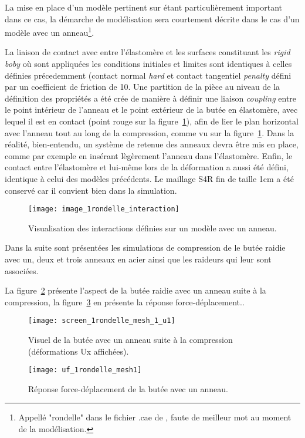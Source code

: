 ﻿\documentclass{article}
\newcommand{\abaqus}{\bsc{Abaqus}\xspace}
\newcommand{\cimg}{0.8}
\begin{document}
La mise en place d'un modèle pertinent sur \abaqus étant particulièrement important dans ce cas, la démarche de modélisation sera courtement décrite dans le cas d'un modèle avec un anneau\footnote{Appellé "rondelle" dans le fichier .cae de \abaqus, faute de meilleur mot au moment de la modélisation.}.

La liaison de contact avec entre l'élastomère et les surfaces constituant les \textit{rigid boby} où sont appliquées les conditions initiales et limites sont identiques à celles définies précedemment (contact normal \textit{hard} et contact tangentiel \textit{penalty} défini par un coefficient de friction de 10. Une partition de la pièce au niveau de la définition des propriétés a été crée de manière à définir une liaison \textit{coupling} entre le point intérieur de l'anneau et le point extérieur de la butée en élastomère, avec lequel il est en contact (point rouge sur la figure~\ref{fig28}), afin de lier le plan horizontal avec l'anneau tout au long de la compression, comme vu sur la figure~\ref{fig28}. Dans la réalité, bien-entendu, un système de retenue des anneaux devra être mis en place, comme par exemple en insérant lègèrement l'anneau dans l'élastomère. Enfin, le contact entre l'élastomère et lui-même lors de la déformation a aussi été défini, identique à celui des modèles précédents. Le maillage S4R fin de taille 1cm a été conservé car il convient bien dans la simulation.

\begin{figure}[!h]
	\centering
	\texttt{[image: image\_1rondelle\_interaction]}
	\caption{Visualisation des interactions définies sur un modèle avec un anneau.}
	\label{fig28}
\end{figure}

Dans la suite sont présentées les simulations de compression de le butée raidie avec un, deux et trois anneaux en acier ainsi que les raideurs qui leur sont associées.

La figure~\ref{fig29} présente l'aspect de la butée raidie avec un anneau suite à la compression, la figure~\ref{fig30} en présente la réponse force-déplacement..

\begin{figure}[!h]
	\centering
	\texttt{[image: screen\_1rondelle\_mesh\_1\_u1]}
	\caption{Visuel de la butée avec un anneau suite à la compression (déformations Ux affichées).}
	\label{fig29}
\end{figure}

\begin{figure}[!h]
	\centering
	\texttt{[image: uf\_1rondelle\_mesh1]}
	\caption{Réponse force-déplacement de la butée avec un anneau.}
	\label{fig30}
\end{figure}
\end{document}
